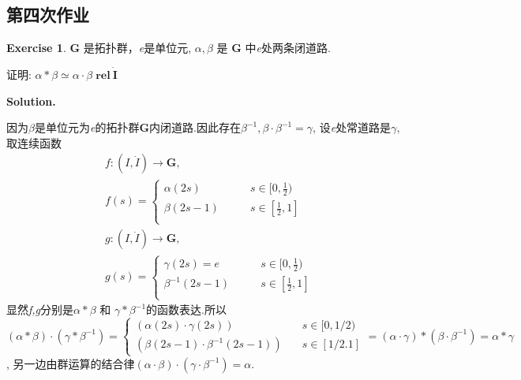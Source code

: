 \documentclass[a4paper]{book}
\newenvironment{solution}%
{\noindent\textbf{Solution.}}%
{\qedhere}
\numberwithin{equation}{chapter}
\theoremstyle{definition}
\newtheorem{exc}[exm]{Exercise}
\begin{document}
\begin{multicols}{2}
\section{第四次作业}

\begin{exc}
	$ \mathbf{G} $ 是拓扑群，\textit{e}是单位元, $ \alpha, \beta $ 是 $ \mathbf{G} $ 中\textit{e}处两条闭道路.
	
	证明: $ \alpha * \beta \simeq \alpha \cdot \beta \; \mathbf{rel} \ \dot{\mathbf{I}} $
\end{exc}

\begin{solution}
	
	因为$\beta$是单位元为\textit{e}的拓扑群$\mathbf{G}$内闭道路.因此存在$\beta^{-1}, \beta \cdot \beta^{-1} = \gamma$, 设\textit{e}处常道路是$\gamma$,取连续函数
	\begin{align*}
		&f: (I, \dot{I}) \rightarrow \mathbf{G}, \\
		&f(s) =
		\begin{cases}
		\alpha(2s) \qquad &s \in [0,\frac{1}{2}) \\
		\beta(2s - 1) \qquad &s \in [\frac{1}{2}, 1] \\
		\end{cases}\\
		&g: (I, \dot{I}) \rightarrow \mathbf{G}, \\
		&g(s) = 
		\begin{cases}
		\gamma(2s) = e \qquad &s \in [0, \frac{1}{2}) \\
		\beta^{-1}(2s - 1) \qquad &s \in [\frac{1}{2}, 1] \\
		\end{cases}
	\end{align*}
	显然\textit{f,g}分别是$\alpha * \beta \text{ 和 } \gamma * \beta^{-1}$的函数表达.所以$(\alpha * \beta) \cdot (\gamma * \beta^{-1}) = \begin{cases}(\alpha(2s) \cdot \gamma(2s)) &\quad s \in [0,1/2)\\
	(\beta(2s-1) \cdot \beta^{-1}(2s-1)) &\quad s \in [1/2. 1]
	\end{cases} = (\alpha \cdot \gamma) * (\beta \cdot \beta^{-1}) = \alpha * \gamma $, 另一边由群运算的结合律$ (\alpha \cdot \beta) \cdot (\gamma \cdot \beta^{-1}) = \alpha $.
	

\end{solution}
\end{multicols}
\end{document}
